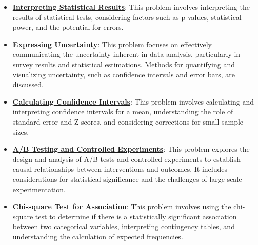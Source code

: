 \documentclass{article}%
\begin{document}
\begin{itemize}[leftmargin=*]
\item \href{https://purdue.brightspace.com/d2l/common/assets/pdfjs-d2l-dist/1.0.14-legacy/web/viewer.html?file=\%2Fcontent\%2Fenforced\%2F1095465-WL.202510.CS24200.LE1\%2F13L2-hypothesis.pdf\%3Fou\%3D1095465\&lang=en-us\&container=d2l-fileviewer-rendered-pdf\&fullscreen=d2l-fileviewer-rendered-pdf-dialog\&height=667#page=37}{\textbf{Interpreting Statistical Results}}: This problem involves interpreting the results of statistical tests, considering factors such as p-values, statistical power, and the potential for errors.%
\item \href{https://purdue.brightspace.com/d2l/common/assets/pdfjs-d2l-dist/1.0.14-legacy/web/viewer.html?file=\%2Fcontent\%2Fenforced\%2F1095465-WL.202510.CS24200.LE1\%2F15L2-AB-testing.pdf\%3Fou\%3D1095465\&lang=en-us\&container=d2l-fileviewer-rendered-pdf\&fullscreen=d2l-fileviewer-rendered-pdf-dialog\&height=667#page=3}{\textbf{Expressing Uncertainty}}: This problem focuses on effectively communicating the uncertainty inherent in data analysis, particularly in survey results and statistical estimations. Methods for quantifying and visualizing uncertainty, such as confidence intervals and error bars, are discussed.%
\item \href{https://purdue.brightspace.com/d2l/common/assets/pdfjs-d2l-dist/1.0.14-legacy/web/viewer.html?file=\%2Fcontent\%2Fenforced\%2F1095465-WL.202510.CS24200.LE1\%2F15L2-AB-testing.pdf\%3Fou\%3D1095465\&lang=en-us\&container=d2l-fileviewer-rendered-pdf\&fullscreen=d2l-fileviewer-rendered-pdf-dialog\&height=667#page=5}{\textbf{Calculating Confidence Intervals}}: This problem involves calculating and interpreting confidence intervals for a mean, understanding the role of standard error and Z-scores, and considering corrections for small sample sizes.%
\item \href{https://purdue.brightspace.com/d2l/common/assets/pdfjs-d2l-dist/1.0.14-legacy/web/viewer.html?file=\%2Fcontent\%2Fenforced\%2F1095465-WL.202510.CS24200.LE1\%2F15L2-AB-testing.pdf\%3Fou\%3D1095465\&lang=en-us\&container=d2l-fileviewer-rendered-pdf\&fullscreen=d2l-fileviewer-rendered-pdf-dialog\&height=667#page=9}{\textbf{A/B Testing and Controlled Experiments}}: This problem explores the design and analysis of A/B tests and controlled experiments to establish causal relationships between interventions and outcomes. It includes considerations for statistical significance and the challenges of large-scale experimentation.%
\item \href{https://purdue.brightspace.com/d2l/common/assets/pdfjs-d2l-dist/1.0.14-legacy/web/viewer.html?file=\%2Fcontent\%2Fenforced\%2F1095465-WL.202510.CS24200.LE1\%2F15L2-AB-testing.pdf\%3Fou\%3D1095465\&lang=en-us\&container=d2l-fileviewer-rendered-pdf\&fullscreen=d2l-fileviewer-rendered-pdf-dialog\&height=667#page=18}{\textbf{Chi-square Test for Association}}: This problem involves using the chi-square test to determine if there is a statistically significant association between two categorical variables, interpreting contingency tables, and understanding the calculation of expected frequencies.%

\end{itemize}
\end{document}
